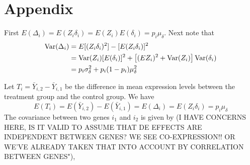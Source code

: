 \documentclass[useAMS,usenatbib, galley]{biom}
\begin{document}
	\section{Appendix}\label{section:appendix}
	
	First $E(\Delta_i) = E(Z_i\delta_i) = E(Z_i)E(\delta_i) = p_i\mu_{\delta}$. Next note that  
	\begin{equation}\notag
	\begin{aligned}
	\text{Var}(\Delta_i) & = E[(Z_i\delta_i)^2]- [E(Z_i\delta_i)]^2 \\
	& = \text{Var}(Z_i)[E(\delta_i)]^2 + \left[(EZ_i)^2 + \text{Var}(Z_i)\right]\text{Var}(\delta_i) \\
	& =p_i\sigma_{\delta}^2 + p_i(1-p_i)\mu_{\delta}^2
	\end{aligned}
	\end{equation}
	
	Let $T_i=\bar{Y}_{i,2}-\bar{Y}_{i,1}$ be the difference in mean expression levels between the treatment group and the control group. We have 
	\[E(T_i) = E(\bar{Y}_{i,2})-E(\bar{Y}_{i,1}) = E(\Delta_i) = E(Z_i\delta_i) = p_i\mu_{\delta}\]
	The covariance between two genes $i_1$ and $i_2$ is given by (I HAVE CONCERNS HERE, IS IT VALID TO ASSUME THAT DE EFFECTS ARE INDEPENDENT BETWEEN GENES?  WE SEE CO-EXPRESSION!! OR WE'VE ALREADY TAKEN THAT INTO ACCOUNT BY CORRELATION BETWEEN GENES"), 
	
\end{document}
